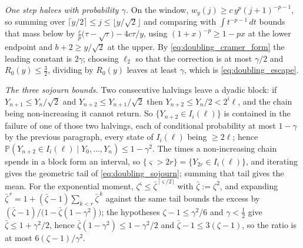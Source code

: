 \emph{One step halves with probability $\gamma$.} On the window,
$w_y(j)\geq c\,y^{p}(j+1)^{-p-1}$, so summing over
$\lceil y/2\rceil\leq j\leq\lfloor y/\sqrt2\rfloor$ and comparing with
$\int t^{-p-1}\,dt$ bounds that mass below by $\frac{c}{p}\bigl(\tau-\sqrt\tau\bigr)-4c\tau/y$,
using $(1+x)^{-p}\geq1-px$ at the lower endpoint and $b+2\geq y/\sqrt2$ at the upper. By
\eqref{eq:doubling_cramer_form} the leading constant is $2\gamma$; choosing $\ell_2$ so that
the correction is at most $\gamma/2$ and $R_0(y)\leq\tfrac32$, dividing by $R_0(y)$ leaves at
least $\gamma$, which is \eqref{eq:doubling_escape}.

\emph{The three sojourn bounds.} Two consecutive halvings leave a dyadic block: if
$Y_{n+1}\leq Y_n/\sqrt2$ and $Y_{n+2}\leq Y_{n+1}/\sqrt2$ then $Y_{n+2}\leq Y_n/2<2^{i}\ell$,
and the chain being non-increasing it cannot return. So $\{Y_{n+2}\in I_i(\ell)\}$ is contained
in the failure of one of those two halvings, each of conditional probability at most
$1-\gamma$ by the previous paragraph, every state of $I_i(\ell)$ being $\geq2\ell$; hence
$\mathbb P(Y_{n+2}\in I_i(\ell)\mid Y_0,\dots,Y_n)\leq1-\gamma^2$. The times a non-increasing
chain spends in a block form an interval, so $\{\varsigma>2r\}=\{Y_{2r}\in I_i(\ell)\}$, and
iterating gives the geometric tail of \eqref{eq:doubling_sojourn}; summing that tail gives the
mean. For the exponential moment, $\zeta^{\varsigma}\leq\bar\zeta^{\,\lceil\varsigma/2\rceil}$
with $\bar\zeta:=\zeta^2$, and expanding
$\bar\zeta^{\,r}=1+(\bar\zeta-1)\sum_{k<r}\bar\zeta^{\,k}$ against the same tail bounds the
excess by $(\bar\zeta-1)/\bigl(1-\bar\zeta(1-\gamma^2)\bigr)$; the hypotheses
$\zeta-1\leq\gamma^2/6$ and $\gamma<\tfrac12$ give $\bar\zeta\leq1+\gamma^2/2$, hence
$\bar\zeta(1-\gamma^2)\leq1-\gamma^2/2$ and $\bar\zeta-1\leq3(\zeta-1)$, so the ratio is at
most $6(\zeta-1)/\gamma^2$.
